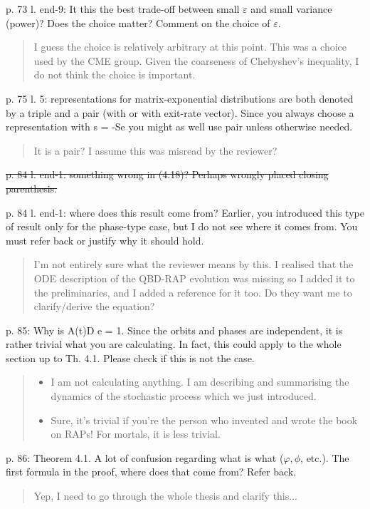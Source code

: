 \documentclass[a4paper]{article}
\begin{document}
p. 73 l. end-9: It this the best trade-off between small \(\varepsilon\) and small variance (power)? Does
the choice matter? Comment on the choice of \(\varepsilon\).
\begin{quote}
    I guess the choice is relatively arbitrary at this point. This was a choice used by the CME group. Given the coarseness of Chebyshev's inequality, I do not think the choice is important.
\end{quote}

p. 75 l. 5: representations for matrix-exponential distributions are both denoted by a triple and a pair (with or with exit-rate vector). Since you always choose a representation with s = -Se you might as well use pair unless otherwise needed.
\begin{quote}
    It is a pair? I assume this was misread by the reviewer? 
\end{quote}

\st{p. 84 l. end-1: something wrong in (4.18)? Perhaps wrongly placed closing parenthesis.}

p. 84 l. end-1: where does this result come from? Earlier, you introduced this type of result only for the phase-type case, but I do not see where it comes from. You must refer back or justify why it should hold.
\begin{quote}
    I'm not entirely sure what the reviewer means by this. I realised that the ODE description of the QBD-RAP evolution was missing so I added it to the preliminaries, and I added a reference for it too. Do they want me to clarify/derive the equation?
\end{quote}

p. 85: Why is A(t)D e = 1. Since the orbits and phases are independent, it is rather trivial what you are calculating. In fact, this could apply to the whole section up to Th. 4.1. Please check if this is not the case.
\begin{quote}
    \begin{itemize}
        \item I am not calculating anything. I am describing and summarising the dynamics of the stochastic process which we just introduced.
        \item Sure, it's trivial if you're the person who invented and wrote the book on RAPs! For mortals, it is less trivial. 
    \end{itemize}
\end{quote}

p. 86: Theorem 4.1. A lot of confusion regarding what is what (\(\varphi, \phi\), etc.). The first formula in the proof, where does that come from? Refer back.
\begin{quote}
    Yep, I need to go through the whole thesis and clarify this...
\end{quote}
\end{document}
